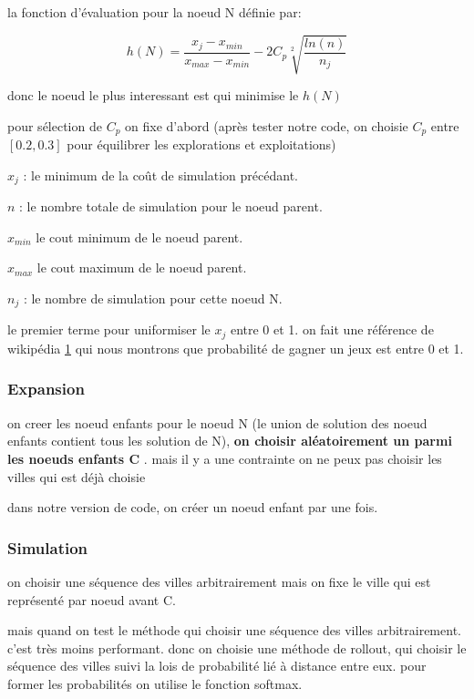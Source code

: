 \documentclass[]{article}
\begin{document}
la fonction d'évaluation pour la noeud N définie par:

\[h(N) = \frac{x_j-x_{min} }{x_{max}-x_{min}}- 2C_p \sqrt[2]{\frac{ln(n)}{n_j}}\]

donc le noeud le plus interessant est qui minimise le \(h(N)\)

pour sélection de \(C_p\) on fixe d'abord (après tester notre code, on
choisie \(C_p\) entre \([0.2,0.3]\) pour équilibrer les explorations et
exploitations)

\(x_j\) : le minimum de la coût de simulation précédant.

\(n\) : le nombre totale de simulation pour le noeud parent.

\(x_{min}\) le cout minimum de le noeud parent.

\(x_{max}\) le cout maximum de le noeud parent.

\(n_j\) : le nombre de simulation pour cette noeud N.

le premier terme pour uniformiser le \(x_j\) entre 0 et 1. on fait une
référence de wikipédia
\href{https://en.wikipedia.org/wiki/Monte_Carlo_tree_search}{1} qui nous
montrons que probabilité de gagner un jeux est entre 0 et 1.

\hypertarget{expansion-1}{%
\subsubsection{Expansion}\label{expansion-1}}

on creer les noeud enfants pour le noeud N (le union de solution des
noeud enfants contient tous les solution de N), \textbf{on choisir
aléatoirement un parmi les noeuds enfants C} . mais il y a une
contrainte on ne peux pas choisir les villes qui est déjà choisie

dans notre version de code, on créer un noeud enfant par une fois.

\hypertarget{simulation-1}{%
\subsubsection{Simulation}\label{simulation-1}}

on choisir une séquence des villes arbitrairement mais on fixe le ville
qui est représenté par noeud avant C.

mais quand on test le méthode qui choisir une séquence des villes
arbitrairement. c'est très moins performant. donc on choisie une méthode
de rollout, qui choisir le séquence des villes suivi la lois de
probabilité lié à distance entre eux. pour former les probabilités on
utilise le fonction softmax.
\end{document}
